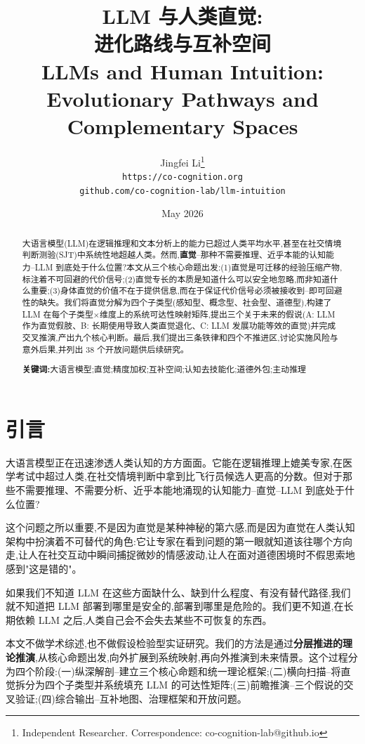\documentclass[11pt,a4paper]{article}
\title{\textbf{LLM 与人类直觉:\\进化路线与互补空间}\\[8pt]
\large LLMs and Human Intuition: Evolutionary Pathways and Complementary Spaces}
\author{Jingfei Li\thanks{Independent Researcher. Correspondence: co-cognition-lab@github.io} \\
\texttt{https://co-cognition.org}\\
\texttt{github.com/co-cognition-lab/llm-intuition}}
\date{May 2026}
\begin{document}
\maketitle

\begin{abstract}
大语言模型(LLM)在逻辑推理和文本分析上的能力已超过人类平均水平,甚至在社交情境判断测验(SJT)中系统性地超越人类。然而,\textbf{直觉}--那种不需要推理、近乎本能的认知能力--LLM 到底处于什么位置?本文从三个核心命题出发:(1)直觉是可迁移的经验压缩产物,标注着不可回避的代价信号;(2)直觉专长的本质是知道什么可以安全地忽略,而非知道什么重要;(3)身体直觉的价值不在于提供信息,而在于保证代价信号必须被接收到--即可回避性的缺失。我们将直觉分解为四个子类型(感知型、概念型、社会型、道德型),构建了 LLM 在每个子类型×维度上的系统可达性映射矩阵,提出三个关于未来的假说(A: LLM 作为直觉假肢、B: 长期使用导致人类直觉退化、C: LLM 发展功能等效的直觉)并完成交叉推演,产出九个核心判断。最后,我们提出三条铁律和四个不推进区,讨论实施风险与意外后果,并列出 38 个开放问题供后续研究。

\textbf{关键词:}大语言模型;直觉;精度加权;互补空间;认知去技能化;道德外包;主动推理
\end{abstract}

\newpage
\tableofcontents
\newpage

\section{引言}

大语言模型正在迅速渗透人类认知的方方面面。它能在逻辑推理上媲美专家,在医学考试中超过人类,在社交情境判断中拿到比飞行员候选人更高的分数。但对于那些不需要推理、不需要分析、近乎本能地涌现的认知能力--直觉--LLM 到底处于什么位置?

这个问题之所以重要,不是因为直觉是某种神秘的第六感,而是因为直觉在人类认知架构中扮演着不可替代的角色:它让专家在看到问题的第一眼就知道该往哪个方向走,让人在社交互动中瞬间捕捉微妙的情感波动,让人在面对道德困境时不假思索地感到"这是错的"。

如果我们不知道 LLM 在这些方面缺什么、缺到什么程度、有没有替代路径,我们就不知道把 LLM 部署到哪里是安全的,部署到哪里是危险的。我们更不知道,在长期依赖 LLM 之后,人类自己会不会失去某些不可恢复的东西。

本文不做学术综述,也不做假设检验型实证研究。我们的方法是通过\textbf{分层推进的理论推演},从核心命题出发,向外扩展到系统映射,再向外推演到未来情景。这个过程分为四个阶段:(一)纵深解剖--建立三个核心命题和统一理论框架;(二)横向扫描--将直觉拆分为四个子类型并系统填充 LLM 的可达性矩阵;(三)前瞻推演--三个假说的交叉验证;(四)综合输出--互补地图、治理框架和开放问题。
\end{document}
